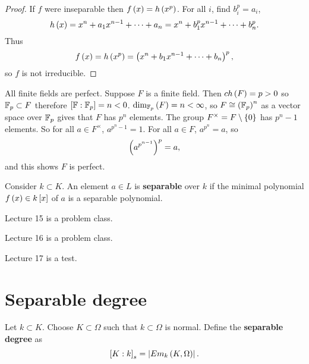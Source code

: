 \begin{proof}
If $ f $ were inseparable then $ f\left( x \right) = h\left( x^p \right) $. For all $ i $, find $ b_i^p = a_i $,
$$ h\left( x \right) = x^n + a_1x^{n - 1} + \dots + a_n = x^n + b_1^px^{n - 1} + \dots + b_n^p. $$
Thus
$$ f\left( x \right) = h\left( x^p \right) = \left( x^n + b_1x^{n - 1} + \dots + b_n \right)^p, $$
so $ f $ is not irreducible.
\end{proof}

\begin{example*}
All finite fields are perfect. Suppose $ F $ is a finite field. Then $ ch\left( F \right) = p > 0 $ so $ \mathbb{F}_p \subset F $ therefore $ \left[ \mathbb{F} : \mathbb{F}_p \right] = n < 0 $. $ \dim_{\mathbb{F}_p}\left( F \right) = n < \infty $, so $ F \cong \left( \mathbb{F}_p \right)^n $ as a vector space over $ \mathbb{F}_p $ gives that $ F $ has $ p^n $ elements. The group $ F^\times = F \setminus \left\{ 0 \right\} $ has $ p^n - 1 $ elements. So for all $ a \in F^\times $, $ a^{p^n - 1} = 1 $. For all $ a \in F $, $ a^{p^n} = a $, so
$$ \left( a^{p^{n - 1}} \right)^p = a, $$
and this shows $ F $ is perfect.
\end{example*}

\begin{definition}
Consider $ k \subset K $. An element $ a \in L $ is \textbf{separable} over $ k $ if the minimal polynomial $ f\left( x \right) \in k\left[ x \right] $ of $ a $ is a separable polynomial.
\end{definition}


Lecture 15 is a problem class.


Lecture 16 is a problem class.


Lecture 17 is a test.

\pagebreak

\section{Separable degree}


\begin{definition}
Let $ k \subset K $. Choose $ K \subset \Omega $ such that $ k \subset \Omega $ is normal. Define the \textbf{separable degree} as
$$ \left[ K : k \right]_s = \left\lvert Em_k\left( K, \Omega \right) \right\rvert. $$
\end{definition}

